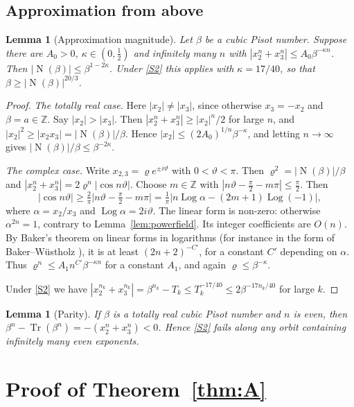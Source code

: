 \documentclass[11pt,a4paper]{article}
\newtheorem{lemma}[theorem]{Lemma}
\theoremstyle{definition}
\theoremstyle{remark}
\newcommand{\Z}{\mathbb{Z}}
\DeclareMathOperator{\Tr}{Tr}
\DeclareMathOperator{\Nm}{N}
\DeclareMathOperator{\Log}{Log}
\begin{document}
\subsection{Approximation from above}
\begin{lemma}[Approximation magnitude]\label{lem:magnitude}
Let $\beta$ be a cubic Pisot number. Suppose there are $A_0>0$, $\kappa\in(0,\frac12)$ and infinitely many $n$ with $|x_2^n+x_3^n|\le A_0\beta^{-\kappa n}$. Then $|\Nm(\beta)|\le\beta^{1-2\kappa}$.
Under \ref{S2} this applies with $\kappa=17/40$, so that $\beta\ge|\Nm(\beta)|^{20/3}$.
\end{lemma}
\begin{proof}
\emph{The totally real case.} Here $|x_2|\ne|x_3|$, since otherwise $x_3=-x_2$ and $\beta=a\in\Z$.
Say $|x_2|>|x_3|$. Then $|x_2^n+x_3^n|\ge|x_2|^n/2$ for large $n$, and $|x_2|^2\ge|x_2x_3|=|\Nm(\beta)|/\beta$.
Hence $|x_2|\le(2A_0)^{1/n}\beta^{-\kappa}$, and letting $n\to\infty$ gives $|\Nm(\beta)|/\beta\le\beta^{-2\kappa}$.

\emph{The complex case.} Write $x_{2,3}=\varrho e^{\pm i\vartheta}$ with $0<\vartheta<\pi$. Then $\varrho^2=|\Nm(\beta)|/\beta$ and $|x_2^n+x_3^n|=2\varrho^n|\cos n\vartheta|$.
Choose $m\in\Z$ with $|n\vartheta-\frac\pi2-m\pi|\le\frac\pi2$. Then
\[
 |\cos n\vartheta|\ge\tfrac2\pi\bigl|n\vartheta-\tfrac\pi2-m\pi\bigr|=\tfrac1\pi\bigl|n\Log\alpha-(2m+1)\Log(-1)\bigr|,
\]
where $\alpha=x_2/x_3$ and $\Log\alpha=2i\vartheta$.
The linear form is non-zero: otherwise $\alpha^{2n}=1$, contrary to Lemma~\ref{lem:powerfield}. Its integer coefficients are $O(n)$.
By Baker's theorem on linear forms in logarithms (for instance in the form of Baker--W\"ustholz \cite{BW93}), it is at least $(2n+2)^{-C'}$, for a constant $C'$ depending on $\alpha$.
Thus $\varrho^n\le A_1n^{C'}\beta^{-\kappa n}$ for a constant $A_1$, and again $\varrho\le\beta^{-\kappa}$.

Under \ref{S2} we have $|x_2^{n_k}+x_3^{n_k}|=\beta^{n_k}-T_k\le T_k^{-17/40}\le2\beta^{-17n_k/40}$ for large $k$.
\end{proof}

\begin{lemma}[Parity]\label{lem:parity}
If $\beta$ is a totally real cubic Pisot number and $n$ is even, then $\beta^n-\Tr(\beta^n)=-(x_2^n+x_3^n)<0$.
Hence \ref{S2} fails along any orbit containing infinitely many even exponents.
\end{lemma}

\section{Proof of Theorem~\ref{thm:A}}\label{sec:A}
\end{document}
